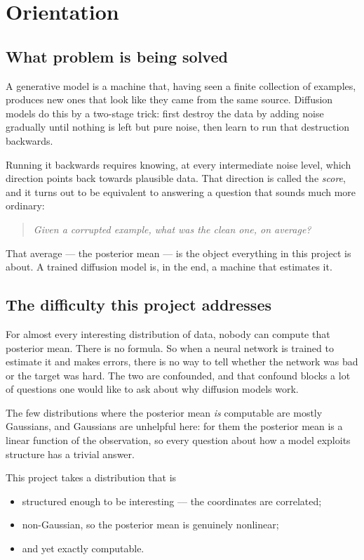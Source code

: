 \chapter{Orientation}
\label{ch:orientation}

\section{What problem is being solved}

A generative model is a machine that, having seen a finite collection of examples, produces
new ones that look like they came from the same source. Diffusion models do this by a
two-stage trick: first destroy the data by adding noise gradually until nothing is left but
pure noise, then learn to run that destruction backwards.

Running it backwards requires knowing, at every intermediate noise level, which direction
points back towards plausible data. That direction is called the \emph{score}, and it turns
out to be equivalent to answering a question that sounds much more ordinary:

\begin{quote}
\emph{Given a corrupted example, what was the clean one, on average?}
\end{quote}

That average --- the posterior mean --- is the object everything in this project is about.
A trained diffusion model is, in the end, a machine that estimates it.

\section{The difficulty this project addresses}

For almost every interesting distribution of data, nobody can compute that posterior mean.
There is no formula. So when a neural network is trained to estimate it and makes errors,
there is no way to tell whether the network was bad or the target was hard. The two are
confounded, and that confound blocks a lot of questions one would like to ask about why
diffusion models work.

The few distributions where the posterior mean \emph{is} computable are mostly Gaussians, and
Gaussians are unhelpful here: for them the posterior mean is a linear function of the
observation, so every question about how a model exploits structure has a trivial answer.

This project takes a distribution that is
\begin{itemize}
\item structured enough to be interesting --- the coordinates are correlated;
\item non-Gaussian, so the posterior mean is genuinely nonlinear;
\item and yet exactly computable.
\end{itemize}

